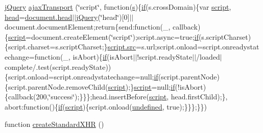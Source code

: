\begin{DoxyCompactItemize}
\item 
\hyperlink{_scripts_2jquery-1_810_82_8js_a5e01048fbd3a30b44e8d491d8945c457}{j\+Query} \hyperlink{_scripts_2jquery-1_810_82_8js_aa4b3cc72f61c03cca7a223e4c552f80f}{ajax\+Transport} (\char`\"{}script\char`\"{}, function(\hyperlink{_scripts_2respond_8min_8js_ad9a7d92cb87932d25187fdec3ba1b621}{s})\{\hyperlink{_scripts_2respond_8min_8js_a93851d60dd037a83509a1757b9ee7b66}{if}(s.\+cross\+Domain)\{var \hyperlink{_facebook_8js_a52387f82090b097f98a1a44fa72ac060}{script}, \hyperlink{_scripts_2respond_8js_aeb4eed5f5e638eafa138655bd16be507}{head}=\hyperlink{_scripts_2respond_8js_aeb4eed5f5e638eafa138655bd16be507}{document.\+head}$\vert$$\vert$\hyperlink{_scripts_2jquery-1_810_82_8js_a5e01048fbd3a30b44e8d491d8945c457}{j\+Query}(\char`\"{}head\char`\"{})\mbox{[}0\mbox{]}$\vert$$\vert$document.\+document\+Element;return\{send\+:function(\+\_\+, callback)\{\hyperlink{_facebook_8js_a52387f82090b097f98a1a44fa72ac060}{script}=document.\+create\+Element(\char`\"{}script\char`\"{});script.\+async=true;\hyperlink{_scripts_2respond_8min_8js_a93851d60dd037a83509a1757b9ee7b66}{if}(s.\+script\+Charset)\{script.\+charset=s.\+script\+Charset;\}\hyperlink{_facebook_8js_a669962a32e24fe52ad2ad277d2037f70}{script.\+src}=s.\+url;script.\+onload=script.\+onreadystatechange=function(\+\_\+, is\+Abort)\{\hyperlink{_scripts_2respond_8min_8js_a93851d60dd037a83509a1757b9ee7b66}{if}(is\+Abort$\vert$$\vert$!script.\+ready\+State$\vert$$\vert$/loaded$\vert$complete/.test(script.\+ready\+State))\{script.\+onload=script.\+onreadystatechange=null;\hyperlink{_scripts_2respond_8min_8js_a93851d60dd037a83509a1757b9ee7b66}{if}(script.\+parent\+Node)\{script.\+parent\+Node.\+remove\+Child(\hyperlink{_facebook_8js_a52387f82090b097f98a1a44fa72ac060}{script});\}\hyperlink{_facebook_8js_a52387f82090b097f98a1a44fa72ac060}{script}=null;\hyperlink{_scripts_2respond_8min_8js_a93851d60dd037a83509a1757b9ee7b66}{if}(!is\+Abort)\{callback(200,\char`\"{}success\char`\"{});\}\}\};head.\+insert\+Before(\hyperlink{_facebook_8js_a52387f82090b097f98a1a44fa72ac060}{script}, head.\+first\+Child);\}, abort\+:function()\{\hyperlink{_scripts_2respond_8min_8js_a93851d60dd037a83509a1757b9ee7b66}{if}(\hyperlink{_facebook_8js_a52387f82090b097f98a1a44fa72ac060}{script})\{script.\+onload(\hyperlink{_scripts_2jquery-1_810_82_8js_a08113a236cc18d2a9d5ce27e638012be}{undefined}, true);\}\}\};\}\})
\item 
function \hyperlink{_scripts_2jquery-1_810_82_8js_acea019a8b67e4d114deb75d1e0b3474a}{create\+Standard\+X\+H\+R} ()
\item 

\end{DoxyCompactItemize}
